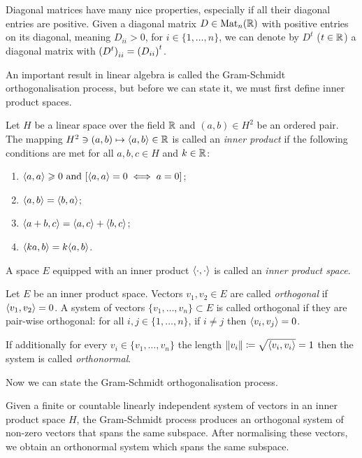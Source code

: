 Diagonal matrices have many nice properties, especially if all their diagonal entries are positive. Given a diagonal matrix $D\in\text{Mat}_n(\mathbb{R})$ with positive entries on its diagonal, meaning $D_{ii}> 0$, for $i\in\{1,\dots, n\}$, we can denote by $D^t$ ($t\in\mathbb{R}$) a diagonal matrix with $\left( D^t\right)_{ii} = \left( D_{ii}\right)^t$. 

An important result in linear algebra is called the Gram-Schmidt orthogonalisation process, but before we can state it, we must first define inner product spaces.

\begin{df}
    Let $H$ be a linear space over the field $\mathbb{R}$ and $(a,b)\in H^2$ be an ordered pair. The mapping $H^2 \ni (a,b)\mapsto \langle a, b \rangle\in\mathbb{R}$ is called an \textit{inner product} if the following conditions are met for all $a,b,c\in H$ and $k\in\mathbb{R}$:
    \begin{enumerate}
        \renewcommand{\labelenumi}{\arabic{enumi}.}
        \item $\langle a, a \rangle\geqslant0 \text{ and } [\langle a, a \rangle=0\iff a=0]$;
        \item $\langle a, b \rangle = \langle b, a \rangle$;
        \item $\langle a+b, c \rangle=\langle a, c \rangle+\langle b, c \rangle$;
        \item $\langle ka, b \rangle=k\langle a, b \rangle$.
    \end{enumerate}

    A space $E$ equipped with an inner product $\langle \cdot, \cdot \rangle$ is called an \textit{inner product space}.
\end{df}

\begin{df}
    Let $E$ be an inner product space. Vectors $v_1, v_2\in E$ are called \textit{orthogonal} if $\langle v_1, v_2 \rangle=0$. A system of vectors $\{v_1,\dots, v_n\}\subset E$ is called orthogonal if they are pair-wise orthogonal: for all $i,j\in\{1,\dots,n\}$, if $i\neq j$ then $\langle v_i, v_j \rangle = 0$. 
    
    If additionally for every $v_i\in\{v_1,\dots, v_n\}$ the length $\left\lVert v_i\right\rVert\coloneqq\sqrt{\langle v_i, v_i \rangle}=1$ then the system is called \textit{orthonormal}.
\end{df}

Now we can state the Gram-Schmidt orthogonalisation process.


\begin{theorem}\label{theor:gsop}
Given a finite or countable linearly independent system of vectors in an inner product space $H$, the Gram-Schmidt process produces an orthogonal system of non-zero vectors that spans the same subspace. After normalising these vectors, we obtain an orthonormal system which spans the same subspace.
\end{theorem}


